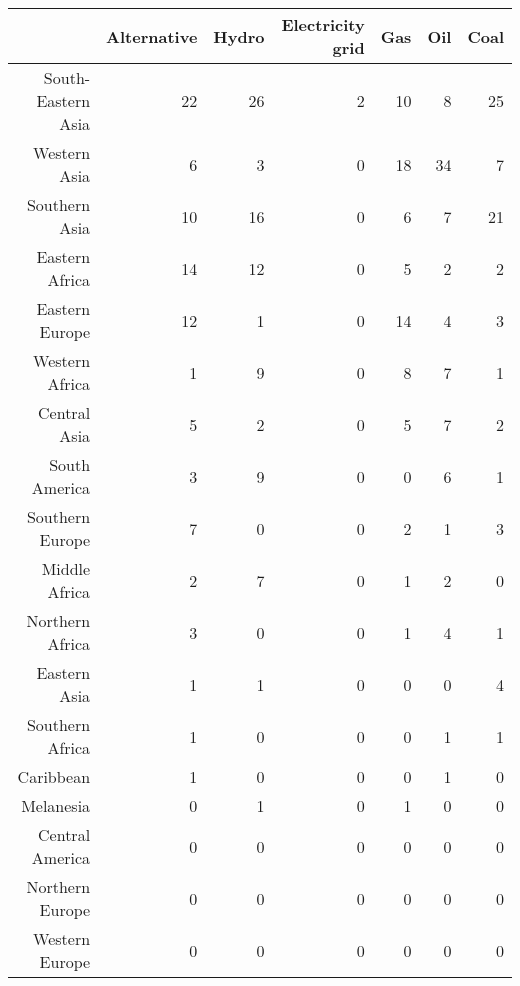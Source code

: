 \begin{table}[ht]
\centering
\begin{tabular}{rrrrrrr}
  \hline
 & Alternative & Hydro & Electricity grid & Gas & Oil & Coal \\ 
  \hline
South-Eastern Asia &  22 &  26 &   2 &  10 &   8 &  25 \\ 
  Western Asia &   6 &   3 &   0 &  18 &  34 &   7 \\ 
  Southern Asia &  10 &  16 &   0 &   6 &   7 &  21 \\ 
  Eastern Africa &  14 &  12 &   0 &   5 &   2 &   2 \\ 
  Eastern Europe &  12 &   1 &   0 &  14 &   4 &   3 \\ 
  Western Africa &   1 &   9 &   0 &   8 &   7 &   1 \\ 
  Central Asia &   5 &   2 &   0 &   5 &   7 &   2 \\ 
  South America &   3 &   9 &   0 &   0 &   6 &   1 \\ 
  Southern Europe &   7 &   0 &   0 &   2 &   1 &   3 \\ 
  Middle Africa &   2 &   7 &   0 &   1 &   2 &   0 \\ 
  Northern Africa &   3 &   0 &   0 &   1 &   4 &   1 \\ 
  Eastern Asia &   1 &   1 &   0 &   0 &   0 &   4 \\ 
  Southern Africa &   1 &   0 &   0 &   0 &   1 &   1 \\ 
  Caribbean &   1 &   0 &   0 &   0 &   1 &   0 \\ 
  Melanesia &   0 &   1 &   0 &   1 &   0 &   0 \\ 
  Central America &   0 &   0 &   0 &   0 &   0 &   0 \\ 
  Northern Europe &   0 &   0 &   0 &   0 &   0 &   0 \\ 
  Western Europe &   0 &   0 &   0 &   0 &   0 &   0 \\ 
   \hline
\end{tabular}
\end{table}
